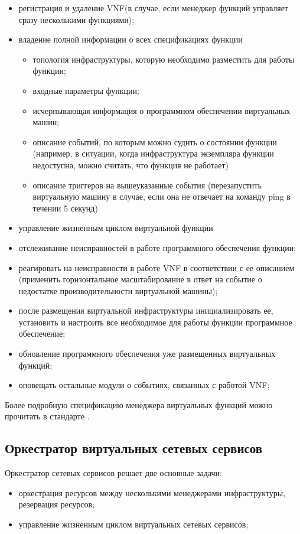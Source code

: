 \documentclass[oneside,final,14pt,a4paper]{extreport}
\begin{document}
\begin{itemize}
	\item регистрация и удаление VNF(в случае, если менеджер функций управляет сразу несколькими функциями);
	\item владение полной информации о всех спецификациях функции
	\begin{itemize}
		\item топология инфраструктуры, которую необходимо разместить для работы функции;
		\item входные параметры функции;
		\item исчерпывающая информация о программном обеспечении виртуальных машин;
		\item описание событий, по которым можно судить о состоянии функции (например, в ситуации, когда инфраструктура экземпляра функции недоступна, можно считать, что функция не работает)
		\item описание триггеров на вышеуказанные события (перезапустить виртуальную машину в случае, если она не отвечает на команду ping в течении 5 секунд)
	\end{itemize}
	\item управление жизненным циклом виртуальной функции
	\item отслеживание неисправностей в работе программного обеспечения функции;
	\item реагировать на неисправности в работе VNF в соответствии с ее описанием (применить горизонтальное масштабирование в ответ на событие о недостатке производительности виртуальной машины);
	\item после размещения виртуальной инфраструктуры инициализировать ее, установить и настроить все необходимое для работы функции программное обеспечение;
	\item обновление программного обеспечения уже размещенных виртуальных функций;
	\item оповещать остальные модули о событиях, связанных с работой VNF;
\end{itemize}

Более подробную спецификацию менеджера виртуальных функций можно прочитать в стандарте \cite{nfv-mano-official-2016-04}.

\subsection{Оркестратор виртуальных сетевых сервисов}
Оркестратор сетевых сервисов решает две основные задачи:
\begin{itemize}
	\item оркестрация ресурсов между несколькими менеджерами инфраструктуры, резервация ресурсов;
	\item управление жизненным циклом виртуальных сетевых сервисов;
\end{itemize}
\end{document}
